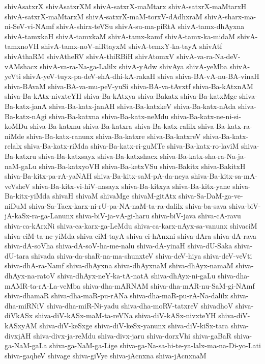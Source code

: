 {shivAsatxrX
shivAsatxrXM
shivA-satxrX-maMtarx
shivA-satxrX-maMtarxH
shivA-satxrX-maMtarxM
shivA-satxrX-maM-torxV-dAdhxraM
shivA-sharx-ma-ni-SeV-vi-NAmf
shivA-shirx-teVSu
shivA-su-ma-piRtA
shivA-tamx-dhAyxna
shivA-tamxkaH
shivA-tamxkaM
shivA-tamx-kamf
shivA-tamx-ka-midaM
shivA-tamxnoVH
shivA-tamx-noV-niRtayxM
shivA-temxY-ka-tayA
shivAtf
shivAthaRM
shivAtheRV
shivA-thiRBiH
shivAtomxV
shivA-va-ra-Na-deV-vAMshacx
shivA-va-ra-Na-ga-Lalilx
shivA-yAdw
shivAya
shivA-yeMba
shivA-yeVti
shivA-yeV-tuyx-pa-deV-shA-dhi-kA-rakaH
shiva
shiva-BA-vA-nu-BA-vinaH
shiva-BAvaM
shiva-BA-va-mu-peV-yuSi
shiva-BA-va-tAvxtf
shiva-Ba-kAtxnAM
shiva-Ba-kAtx-nivxteYH
shiva-Ba-kAtxya
shiva-Bakatx
shiva-Ba-katxMge
shiva-Ba-katx-janA
shiva-Ba-katx-janAH
shiva-Ba-katxkeV
shiva-Ba-katx-nAda
shiva-Ba-katx-nAgi
shiva-Ba-katxna
shiva-Ba-katx-neMdu
shiva-Ba-katx-ne-ni-si-koMDu
shiva-Ba-katxnu
shiva-Ba-katxra
shiva-Ba-katx-ralilx
shiva-Ba-katx-ra-niMde
shiva-Ba-katx-ranunx
shiva-Ba-katxre
shiva-Ba-katxreV
shiva-Ba-katx-relalx
shiva-Ba-katx-riMda
shiva-Ba-katx-ri-guMTe
shiva-Ba-katx-ro-laviM
shiva-Ba-katxru
shiva-Ba-katxsayx
shiva-Ba-katxshacx
shiva-Ba-katx-sha-ra-Na-ja-naM-gaLu
shiva-Ba-katxyoVH
shiva-Ba-ketxVSu
shiva-Bakitx
shiva-BakitxH
shiva-Ba-kitx-pa-rA-yaNAH
shiva-Ba-kitx-saM-pA-da-neya
shiva-Ba-kitx-sa-mA-veVsheV
shiva-Ba-kitx-vi-hiV-nasayx
shiva-Ba-kitxya
shiva-Ba-kitx-yane
shiva-Ba-kitx-yiMda
shivaH
shivaM
shivaMge
shivaM-gitAtx
shiva-Sa-DaM-ga-ve-niDuM
shiva-Sa-Tacx-karx-ni-rU-pa-NA-naM-ta-ra-dalilx
shiva-ba-sava
shiva-biV-jA-kaSx-ra-ga-Lanunx
shiva-biV-ja-vA-gi-haru
shiva-biV-java
shiva-cA-ravu
shiva-ca-kArxNi
shiva-ca-karx-ga-LeMdu
shiva-ca-karx-nAyx-sa-vanunx
shivaciM
shiva-ciM-ta-ne-yiMda
shiva-ciM-tayA
shiva-ci-hAnxni
shiva-dAra
shiva-dA-rava
shiva-dA-soVha
shiva-dA-soV-ha-me-nalu
shiva-dA-yinaH
shiva-dU-Saka
shiva-dU-tara
shivada
shiva-da-shaR-na-ma-shunxteV
shiva-deV-hiya
shiva-deV-veVti
shiva-dhA-ra-Namf
shiva-dhAyxna
shiva-dhAyxnaM
shiva-dhAyx-namaM
shiva-dhAyx-na-ratoV
shiva-dhAyx-neY-ka-tA-natA
shiva-dhAyx-ni-gaLu
shiva-dha-mAMR-ta-rA-La-veMba
shiva-dha-mARNAM
shiva-dha-mAR-nu-SaM-gi-NAmf
shiva-dhamaR
shiva-dha-maR-pu-rANa
shiva-dha-maR-pu-rA-Na-dalilx
shiva-dha-miRNiV
shiva-dha-miR-Ni-yadu
shiva-dha-moRV-tatxreV
shivadhoV
shiva-diVkASx
shiva-diV-kASx-maM-ta-reVNa
shiva-diV-kASx-nivxteYH
shiva-diV-kASxyAM
shiva-diV-keSxge
shiva-diV-keSx-yanunx
shiva-diV-kiSx-tara
shiva-divxjAH
shiva-divx-ja-reMdu
shiva-divx-jaru
shiva-dorxVhi
shiva-gaBaR
shiva-ga-NaM-gaLa
shiva-ga-NaM-ga-Lige
shiva-ga-Na-sa-hi-te-ya-lalx-ma-na-Di-yo-Lati
shiva-gaqheV
shivage
shiva-giVye
shiva-jAcnxna
shiva-jAcnxnaM
}
